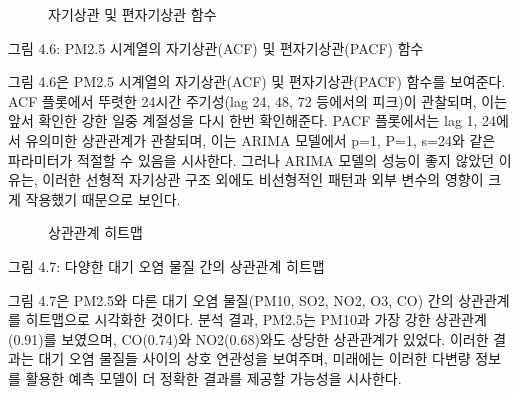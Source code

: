 \documentclass[12pt,ko,a4,]{report}
\begin{document}
\begin{figure}
\centering
{}
\caption{자기상관 및 편자기상관 함수}
\end{figure}

그림 4.6: PM2.5 시계열의 자기상관(ACF) 및 편자기상관(PACF) 함수

그림 4.6은 PM2.5 시계열의 자기상관(ACF) 및 편자기상관(PACF) 함수를
보여준다. ACF 플롯에서 뚜렷한 24시간 주기성(lag 24, 48, 72 등에서의
피크)이 관찰되며, 이는 앞서 확인한 강한 일중 계절성을 다시 한번
확인해준다. PACF 플롯에서는 lag 1, 24에서 유의미한 상관관계가 관찰되며,
이는 ARIMA 모델에서 p=1, P=1, s=24와 같은 파라미터가 적절할 수 있음을
시사한다. 그러나 ARIMA 모델의 성능이 좋지 않았던 이유는, 이러한 선형적
자기상관 구조 외에도 비선형적인 패턴과 외부 변수의 영향이 크게 작용했기
때문으로 보인다.

\begin{figure}
\centering
{}
\caption{상관관계 히트맵}
\end{figure}

그림 4.7: 다양한 대기 오염 물질 간의 상관관계 히트맵

그림 4.7은 PM2.5와 다른 대기 오염 물질(PM10, SO2, NO2, O3, CO) 간의
상관관계를 히트맵으로 시각화한 것이다. 분석 결과, PM2.5는 PM10과 가장
강한 상관관계(0.91)를 보였으며, CO(0.74)와 NO2(0.68)와도 상당한
상관관계가 있었다. 이러한 결과는 대기 오염 물질들 사이의 상호 연관성을
보여주며, 미래에는 이러한 다변량 정보를 활용한 예측 모델이 더 정확한
결과를 제공할 가능성을 시사한다.
\end{document}
